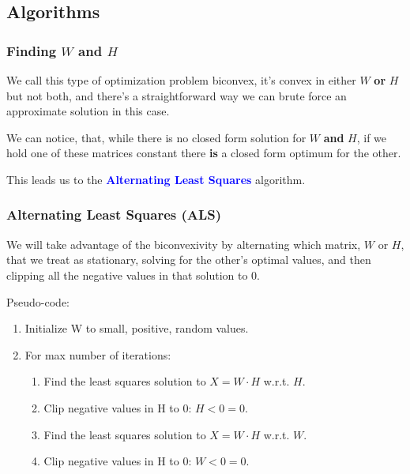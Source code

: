 \documentclass{beamer}
\begin{document}
\subsection{Algorithms}
\begin{frame}
  \frametitle{Finding $W$ and $H$}
  We call this type of optimization problem biconvex, it's convex in either $W$ \textbf{or} $H$ but not both, and there's a straightforward way we can brute force an approximate solution in this case. \vspace{4mm} \pause

  We can notice, that, while there is no closed form solution for $W$ \textbf{and} $H$, if we hold one of these matrices constant there \textbf{is} a closed form optimum for the other. \vspace{4mm}

  This leads us to the  \textbf{\textcolor{blue}{Alternating Least Squares}} algorithm.
\end{frame}

\begin{frame}
  \frametitle{Alternating Least Squares (ALS)}
  We will take advantage of the biconvexivity by alternating which matrix, $W$ or $H$, that we treat as stationary, solving for the other's optimal values, and then clipping all the negative values in that solution to 0. \vspace{4mm} \pause

  Pseudo-code:
  \begin{enumerate}
    \item Initialize W to small, positive, random values.
    \item For max number of iterations:
      \begin{enumerate}
        \item Find the least squares solution to $ X = W \cdot H $ w.r.t. $H$.
        \item Clip negative values in H to 0: $ H < 0 = 0$.
        \item Find the least squares solution to $ X = W \cdot H $ w.r.t. $W$.
        \item Clip negative values in H to 0: $ W < 0 = 0$.
      \end{enumerate}
  \end{enumerate}
\end{frame}
\end{document}
